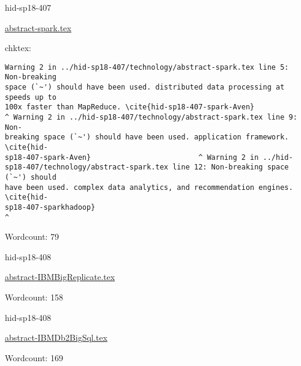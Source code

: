 

\begin{IU}

hid-sp18-407

\href{https://github.com/cloudmesh-community/hid-sp18-407/blob/master//technology/abstract-spark.tex}{abstract-spark.tex}

 
chktex:
\begin{tiny}
\begin{verbatim}
Warning 2 in ../hid-sp18-407/technology/abstract-spark.tex line 5: Non-breaking
space (`~') should have been used. distributed data processing at speeds up to
100x faster than MapReduce. \cite{hid-sp18-407-spark-Aven}
^ Warning 2 in ../hid-sp18-407/technology/abstract-spark.tex line 9: Non-
breaking space (`~') should have been used. application framework. \cite{hid-
sp18-407-spark-Aven}                         ^ Warning 2 in ../hid-
sp18-407/technology/abstract-spark.tex line 12: Non-breaking space (`~') should
have been used. complex data analytics, and recommendation engines.  \cite{hid-
sp18-407-sparkhadoop}                                                       ^
\end{verbatim}
\end{tiny}

Wordcount: 79

\end{IU}



\begin{IU}

hid-sp18-408

\href{https://github.com/cloudmesh-community/hid-sp18-408/blob/master//technology/abstract-IBMBigReplicate.tex}{abstract-IBMBigReplicate.tex}

 

Wordcount: 158

\end{IU}



\begin{IU}

hid-sp18-408

\href{https://github.com/cloudmesh-community/hid-sp18-408/blob/master//technology/abstract-IBMDb2BigSql.tex}{abstract-IBMDb2BigSql.tex}

 

Wordcount: 169

\end{IU}

